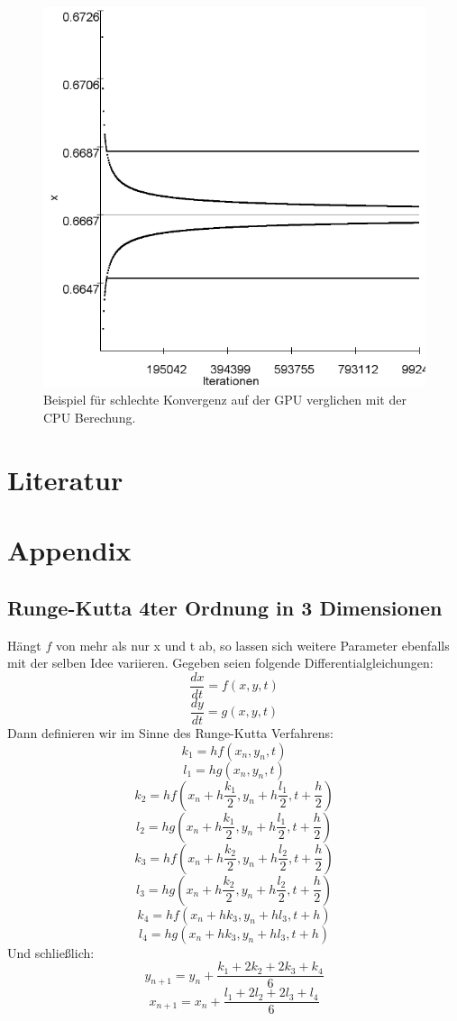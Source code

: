 \documentclass{scrartcl}
\begin{document}
\begin{figure}[!htbp]
\centering
\includegraphics[scale=0.18]{log-konv-r3}
\caption{Beispiel für schlechte Konvergenz auf der GPU verglichen mit der CPU Berechung.}
\label{fig:bsp-opencl}
\end{figure}



\section{ Literatur }
\nocite{*}
\printbibliography

\section{Appendix}

\subsection {Runge-Kutta 4ter Ordnung in 3 Dimensionen}
Hängt $f$ von mehr als nur x und t ab, so lassen sich weitere Parameter ebenfalls mit der selben Idee variieren.
Gegeben seien folgende Differentialgleichungen:
$$\frac{dx}{dt}=f(x,y,t)$$
$$\frac{dy}{dt}=g(x,y,t)$$
Dann definieren wir im Sinne des Runge-Kutta Verfahrens:
$$k_1 = hf(x_n,y_n,t)$$
$$l_1 = hg(x_n,y_n,t)$$
$$k_2 = hf(x_n+h\frac{k_1}{2},y_n+h\frac{l_1}{2},t+\frac{h}{2})$$
$$l_2 = hg(x_n+h\frac{k_1}{2},y_n+h\frac{l_1}{2},t+\frac{h}{2})$$
$$k_3 = hf(x_n+h\frac{k_2}{2},y_n+h\frac{l_2}{2},t+\frac{h}{2})$$
$$l_3 = hg(x_n+h\frac{k_2}{2},y_n+h\frac{l_2}{2},t+\frac{h}{2})$$
$$k_4 = hf(x_n+hk_3,y_n+hl_3,t+h)$$
$$l_4 = hg(x_n+hk_3,y_n+hl_3,t+h)$$
Und schließlich:
$$y_{n+1} = y_n + \frac{k_1 + 2k_2 + 2k_3 + k_4}{6}$$
$$x_{n+1} = x_n + \frac{l_1 + 2l_2 + 2l_3 + l_4}{6}$$
\end{document}
